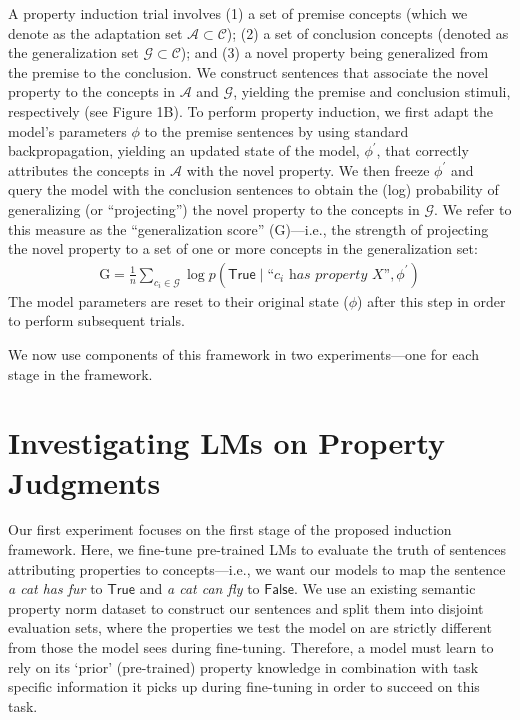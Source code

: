 \documentclass[10pt,letterpaper]{article}
\newcommand{\adaptation}{\mathcal{A}}
\newcommand{\generalization}{\mathcal{G}}
\newcommand{\concepts}{\mathcal{C}}
\newcommand{\true}{\mathsf{True}}
\newcommand{\false}{\mathsf{False}}
\newcommand{\metric}{\mathrm{G}}
\begin{document}
A property induction trial involves (1) a set of premise concepts (which we denote as the adaptation set $\adaptation \subset \concepts$); (2) a set of conclusion concepts (denoted as the generalization set $\generalization \subset \concepts$); and (3) a novel property being generalized from the premise to the conclusion.
We construct sentences that associate the novel property to the concepts in $\adaptation$ and $\generalization$, yielding the premise and conclusion stimuli, respectively (see Figure 1B).
To perform property induction, we first adapt the model's parameters $\phi$ to the premise sentences by using standard backpropagation, yielding an updated state of the model, $\phi^{\prime}$, that correctly attributes the concepts in $\adaptation$ with the novel property.
We then freeze $\phi^{\prime}$ and query the model with the conclusion sentences to obtain the (log) probability of generalizing (or ``projecting'') the novel property to the concepts in $\generalization$. 
We refer to this measure as the ``generalization score'' ($\metric$)---i.e., the strength of projecting the novel property to a set of one or more concepts in the generalization set:
\begin{align}
    \metric = \frac{1}{n}\sum_{\textit{c}_i \in \mathcal{G}} \log p(\true \mid \textit{``c}_i\textit{ has property X''}, \phi^{\prime})\label{eq:genscore}
\end{align}
The model parameters are reset to their original state ($\phi$) after this step in order to perform subsequent trials. 

We now use components of this framework in two experiments---one for each stage in the framework.


\section{Investigating LMs on Property Judgments}
Our first experiment focuses on the first stage of the proposed induction framework. Here, we fine-tune pre-trained LMs to evaluate the truth of sentences attributing properties to concepts---i.e., we want our models to map the sentence \textit{a cat has fur} to $\true$ and \textit{a cat can fly} to $\false$. We use an existing semantic property norm dataset to construct our sentences and split them into disjoint evaluation sets, where the properties we test the model on are strictly different from those the model sees during fine-tuning. Therefore, a model must learn to rely on its `prior' (pre-trained) property knowledge in combination with task specific information it picks up during fine-tuning in order to succeed on this task.
\end{document}
